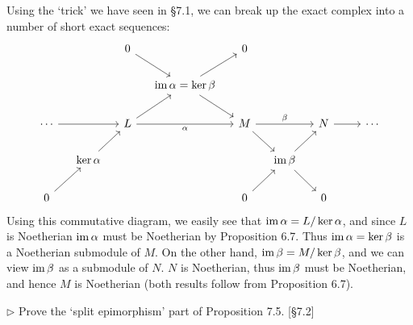 \begin{solution}
	Using the `trick' we have seen in \S 7.1, we can break up the exact complex into a number of short exact sequences:
	\[
		\begin{tikzcd}[column sep=small]
			& & 0
			\arrow[dr]
			& & 0 \\
			& & & \im \alpha = \ker \beta
			\arrow[ur]
			\arrow[dr] \\
			\cdots
			\arrow[rr]
			& & L
			\arrow[rr, "\alpha"']
			\arrow[ur]
			& & M
			\arrow[rr, "\beta"]
			\arrow[dr]
			& & N
			\arrow[rr]
			& & \cdots \\
			& \ker \alpha
			\arrow[ur]
			& & & & \im \beta
			\arrow[ur]
			\arrow[dr] \\
			0
			\arrow[ur]
			& & & &  0
			\arrow[ur]
			& & 0
		\end{tikzcd}
	\]
	Using this commutative diagram, we easily see that $\operatorname{im} \alpha = L/\ker \alpha$, and since $L$ is Noetherian $\operatorname{im} \alpha$ must be Noetherian by Proposition 6.7. Thus $\operatorname{im} \alpha = \ker \beta$ is a Noetherian submodule of $M$. On the other hand, $\operatorname{im} \beta = M/\ker \beta$, and we can view $\operatorname{im} \beta$ as a submodule of $N$. $N$ is Noetherian, thus $\operatorname{im} \beta$ must be Noetherian, and hence $M$ is Noetherian (both results follow from Proposition 6.7).
\end{solution}

\begin{problem}
	$\triangleright$ Prove the `split epimorphism' part of Proposition 7.5. [\S 7.2]
\end{problem}

